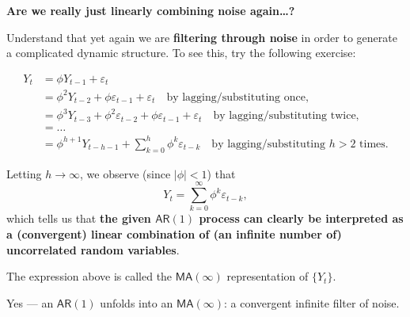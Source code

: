 \documentclass[
  letterpaper,
  DIV=11,
  numbers=noendperiod]{scrartcl}
\newcommand{\slidelabel}[1]{{\color{embernavy}\bfseries\large #1\par\vspace{5pt}}}
\newenvironment{slidefooter}{%
  \par\vspace{7pt}{\color{emberrule}\rule{\linewidth}{0.4pt}}\par\vspace{4pt}%
  \color{emberamber}\itshape\small}{\par}
\begin{document}
\begin{slidebox}

\slidelabel{Are we really just linearly combining noise again\ldots?}

Understand that yet again we are \textbf{filtering through noise} in
order to generate a complicated dynamic structure. To see this, try the
following exercise:

\[\begin{aligned} Y_t &= \phi Y_{t-1} + \varepsilon_t \\ &= \phi^2 Y_{t-2} + \phi\varepsilon_{t-1} + \varepsilon_t \quad \text{by lagging/substituting once,} \\ &= \phi^3 Y_{t-3} + \phi^2\varepsilon_{t-2} + \phi\varepsilon_{t-1} + \varepsilon_t \quad \text{by lagging/substituting twice,} \\ &= \ldots \\ &= \phi^{h+1} Y_{t-h-1} + \sum_{k=0}^{h}\phi^k\varepsilon_{t-k} \quad \text{by lagging/substituting } h > 2 \text{ times.} \end{aligned}\]

Letting \(h \to \infty\), we observe (since \(|\phi| < 1\)) that
\[Y_t = \sum_{k=0}^{\infty}\phi^k\varepsilon_{t-k},\] which tells us
that \textbf{the given \(\mathsf{AR}(1)\) process can clearly be
interpreted as a (convergent) linear combination of (an infinite number
of) uncorrelated random variables}.

The expression above is called the \(\mathsf{MA}(\infty)\)
representation of \(\{Y_t\}\).

\begin{slidefooter}

Yes --- an \(\mathsf{AR}(1)\) unfolds into an \(\mathsf{MA}(\infty)\): a
convergent infinite filter of noise.

\end{slidefooter}

\end{slidebox}
\end{document}
